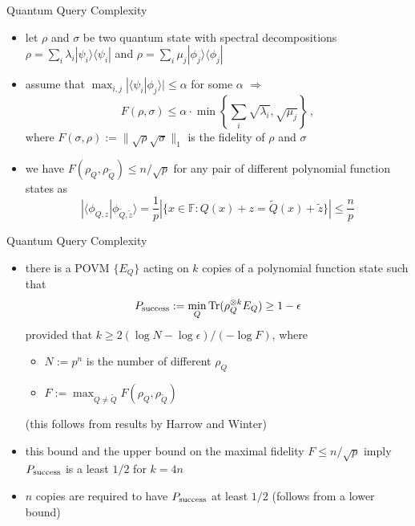\documentclass[slideColor]{prosper}
\newcommand{\F}{{\mathbb{F}}}
\renewcommand{\>}{\rangle}
\newcommand{\<}{\langle}
\begin{document}

\begin{slide}{Quantum Query Complexity}
\begin{itemize}
\item let $\rho$ and $\sigma$ be two quantum state with spectral decompositions $\rho=\sum_i \lambda_i |\psi_i\>\<\psi_i|$ and $\rho=\sum_i \mu_j |\phi_j\>\<\phi_j|$
\item assume that $\max_{i,j}|\<\psi_i|\phi_j\>|\le\alpha$ for some $\alpha$ $\Rightarrow$
\[
F(\rho,\sigma)\le\alpha \cdot \min \left\{
\sum_i \sqrt{\lambda_i}, \sqrt{\mu_j}
\right\}\,,
\]
where $F(\sigma,\rho):=\|\sqrt{\rho}\sqrt{\sigma}\|_1$ is the fidelity of $\rho$ and $\sigma$
\item we have $F(\rho_Q,\rho_{\tilde{Q}})\le n/\sqrt{p}$ for any pair of different polynomial function states as
\[
|\<\phi_{Q,z}|\phi_{\tilde{Q},\tilde{z}}\> = \frac{1}{p} |\{x \in \F : Q(x) + z = \tilde{Q}(x) + \tilde{z}\}| \le
\frac{n}{p}
\]
\end{itemize}
\end{slide}


\begin{slide}{Quantum Query Complexity}
\begin{itemize}
\item there is a POVM $\{E_Q\}$ acting on $k$ copies of a polynomial function state such that
\[
P_{\rm success} := \min_Q \mathrm{Tr} (\rho_Q^{\otimes k} E_Q) \ge 1-\epsilon
\]
provided that $k\ge 2(\log N - \log\epsilon)/(-\log F)$, where 
\begin{itemize}
\item $N:=p^n$ is the number of different $\rho_Q$ 
\item $F:=\max_{Q\neq\tilde{Q}} F(\rho_Q,\rho_{\tilde{Q}})$
\end{itemize}
(this follows from results by {\sc Harrow and Winter})
\item this bound and the upper bound on the maximal fidelity $F\le n/\sqrt{p}$ imply $P_{\rm success}$ is a least $1/2$ for $k=4n$
\item $n$ copies are required to have $P_{\rm success}$ at least $1/2$ (follows from a lower bound)
\end{itemize}
\end{slide}

\end{document}
